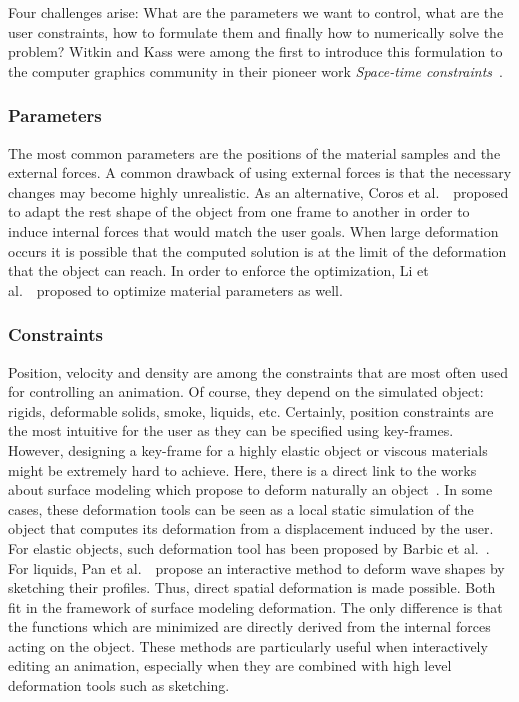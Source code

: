 Four challenges arise: What are the parameters we want to control, what are the user constraints, how to formulate them and finally how to numerically solve the problem?
Witkin and Kass were among the first to introduce this formulation to the computer graphics community in their pioneer work \emph{Space-time constraints}~\cite{Witkin1988}.

\subsubsection{Parameters}
The most common parameters are the positions of the material samples and the external forces.
A common drawback of using external forces is that the necessary changes may become highly unrealistic.
As an alternative, Coros et al.~\cite{Coros2012}~proposed to adapt the rest shape of the object from one frame to another in order to induce internal forces that would match the user goals.
When large deformation occurs it is possible that the computed solution is at the limit of the deformation that the object can reach. In order to enforce the optimization, Li et al.~\cite{Li2014}~proposed to optimize material parameters as well. 

\subsubsection{Constraints}
Position, velocity and density are among the constraints that are most often used for controlling an animation. 
Of course, they depend on the simulated object: rigids, deformable solids, smoke, liquids, etc. 
Certainly, position constraints are the most intuitive for the user as they can be specified using key-frames. 
However, designing a key-frame for a highly elastic object or viscous materials might be extremely hard to achieve. 
Here, there is a direct link to the works about surface modeling which propose to deform naturally an object~\cite{Sorkine2007, Hildebrandt2011}. 
In some cases, these deformation tools can be seen as a local static simulation of the object that computes its deformation from a displacement induced by the user. 
For elastic objects, such deformation tool has been proposed by Barbic et al.~\cite{Barbic2012}.
For liquids, Pan et al.~\cite{Pan2013}~propose an interactive method to deform wave shapes by sketching their profiles. 
Thus, direct spatial deformation is made possible. 
Both fit in the framework of surface modeling deformation. 
The only difference is that the functions which are minimized are directly derived from the internal forces acting on the object. 
These methods are particularly useful when interactively editing an animation, especially when they are combined with high level deformation tools such as sketching.

